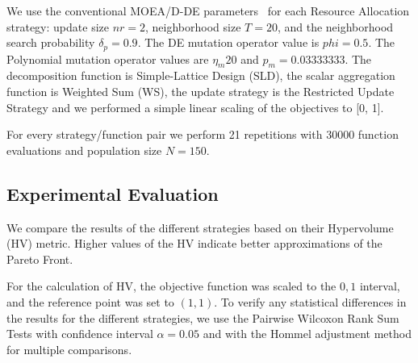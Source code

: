 We use the conventional MOEA/D-DE parameters~\cite{li2009multiobjective} for each Resource Allocation strategy: update size $nr = 2$, neighborhood size $T = 20$, and the neighborhood search probability $\delta_p = 0.9$. The DE mutation operator value is $phi=0.5$. The Polynomial mutation operator values are $\eta_m 20$ and $p_m = 0.03333333$. The decomposition function is Simple-Lattice Design (SLD), the scalar aggregation function is Weighted Sum (WS), the update strategy is the Restricted Update Strategy and we performed a simple linear scaling of the objectives to [0, 1].

For every strategy/function pair we perform 21 repetitions with 30000 function evaluations and population size $N=150$.

\subsection{Experimental Evaluation}

We compare the results of the different strategies based on their Hypervolume (HV) metric. Higher values of the HV indicate better approximations of the Pareto Front. %

For the calculation of HV, the objective function was scaled to the $0,1$ interval, and the reference point was set to $(1,1)$. To verify any statistical differences in the results for the different strategies, we use the Pairwise Wilcoxon Rank Sum Tests with confidence interval $\alpha = 0.05$ and with the Hommel adjustment method for multiple comparisons. %
